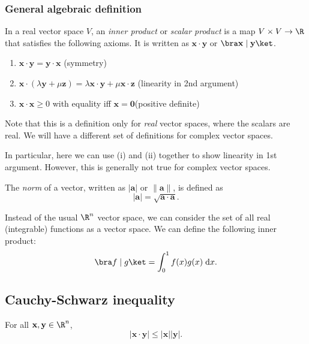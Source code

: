 \documentclass[a4paper]{article}
\begin{document}
\subsubsection{General algebraic definition}
\begin{defi}
  In a real vector space $V$, an \emph{inner product} or \emph{scalar product} is a map $V\times V\to \R$ that satisfies the following axioms. It is written as $\mathbf{x\cdot y}$ or $\bra\mathbf{x\mid y}\ket$.
  \begin{enumerate}
    \item $\mathbf{x\cdot y = y\cdot x}$ \hfill (symmetry)
    \item $\mathbf{x}\cdot (\lambda\mathbf{y} + \mu\mathbf{z}) = \lambda\mathbf{x\cdot y} + \mu\mathbf{x\cdot z}$ \hfill (linearity in 2nd argument)
    \item $\mathbf{x\cdot x}\geq 0$ with equality iff $\mathbf{x = 0}$\hfill (positive definite)
  \end{enumerate}
\end{defi}
Note that this is a definition only for \emph{real} vector spaces, where the scalars are real. We will have a different set of definitions for complex vector spaces.

In particular, here we can use (i) and (ii) together to show linearity in 1st argument. However, this is generally not true for complex vector spaces.

\begin{defi}
  The \emph{norm} of a vector, written as $|\mathbf{a}|$ or $\|\mathbf{a}\|$, is defined as
  \[
    |\mathbf{a}| = \sqrt{\mathbf{a\cdot a}}.
  \]
\end{defi}

\begin{eg}
  Instead of the usual $\R^n$ vector space, we can consider the set of all real (integrable) functions as a vector space. We can define the following inner product:
  \[
    \bra f\mid g\ket = \int_0^1f(x)g(x)\;\mathrm{d} x.
  \]
\end{eg}

\subsection{Cauchy-Schwarz inequality}
\begin{thm}
  For all $\mathbf{x, y}\in \R^n$,
  \[
    |\mathbf{x}\cdot \mathbf{y}| \leq |\mathbf{x}||\mathbf{y}|.
  \]
\end{thm}
\end{document}
